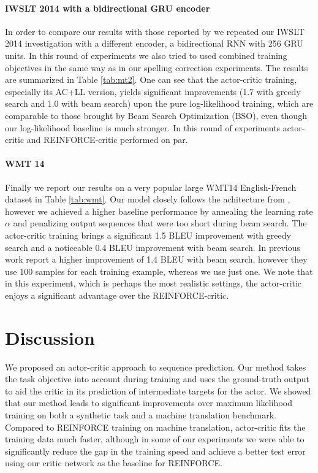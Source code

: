 \documentclass{article} \usepackage{iclr2017_conference,times}
\begin{document}
\paragraph{IWSLT 2014 with a bidirectional GRU encoder}
In order to compare our results with those reported by
\citet{wiseman2016sequence} we repeated our IWSLT 2014 investigation with a
different encoder, a bidirectional RNN with 256 GRU units. In this round of
experiments we also tried to used combined training objectives in the same way as in
our spelling correction experiments. The results are summarized in Table \ref{tab:mt2}.
One can see that the actor-critic training, especially its AC+LL version, yields significant improvements (1.7 with greedy search and 1.0 with beam search) upon the pure log-likelihood training, which are comparable to those brought by Beam Search Optimization (BSO), even though our log-likelihood baseline is much stronger. In this round of experiments actor-critic and REINFORCE-critic performed on par.

\paragraph{WMT 14}
Finally we report our results on a very popular
large WMT14 
English-French dataset \citep{cho2014learning} in Table \ref{tab:wmt}. Our
model closely follows the
achitecture from \citep{bahdanau2015neural}, however we achieved a higher
baseline performance by annealing the learning rate $\alpha$ and penalizing 
output sequences that were too short during beam search. The actor-critic training brings a
significant 1.5 BLEU improvement with greedy search and a noticeable 0.4 BLEU
improvement with beam search. In previous work \cite{shen2015minimum}
report a higher improvement of 1.4 BLEU with beam search, however they use 100
samples for each training example, whereas we use just one. We note that in this experiment, which is perhaps the most realistic settings, the actor-critic enjoys a significant advantage over the REINFORCE-critic.


\section{Discussion}
\label{sec:discuss}

We proposed an actor-critic approach to sequence prediction. Our method takes
the task objective into account during training and uses the ground-truth output to aid
the critic in its prediction of intermediate targets for the actor. We showed that our method leads to
significant improvements over maximum likelihood training on both a synthetic task
and a machine translation benchmark. Compared to REINFORCE training on machine translation,
actor-critic fits the training data much faster, although in some of our
experiments we were able to significantly reduce the gap in the training speed and
achieve a better test error using our critic network as the baseline for
REINFORCE.
\end{document}
